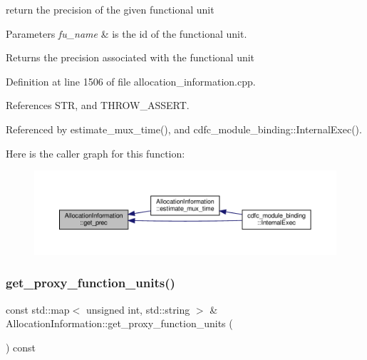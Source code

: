 return the precision of the given functional unit 


\begin{DoxyParams}{Parameters}
{\em fu\+\_\+name} & is the id of the functional unit. \\
\hline
\end{DoxyParams}
\begin{DoxyReturn}{Returns}
the precision associated with the functional unit 
\end{DoxyReturn}


Definition at line 1506 of file allocation\+\_\+information.\+cpp.



References S\+TR, and T\+H\+R\+O\+W\+\_\+\+A\+S\+S\+E\+RT.



Referenced by estimate\+\_\+mux\+\_\+time(), and cdfc\+\_\+module\+\_\+binding\+::\+Internal\+Exec().

Here is the caller graph for this function\+:
\nopagebreak
\begin{figure}[H]
\begin{center}
\leavevmode
\includegraphics[width=350pt]{d7/d79/classAllocationInformation_ac2e117b073287246d06915ef5d089ae5_icgraph}
\end{center}
\end{figure}
\mbox{\label{classAllocationInformation_ad313cb16811effed12da7bee69c9b16d}} 
\subsubsection{\texorpdfstring{get\+\_\+proxy\+\_\+function\+\_\+units()}{get\_proxy\_function\_units()}}
{\footnotesize\ttfamily const std\+::map$<$ unsigned int, std\+::string $>$ \& Allocation\+Information\+::get\+\_\+proxy\+\_\+function\+\_\+units (\begin{DoxyParamCaption}{ }\end{DoxyParamCaption}) const}



